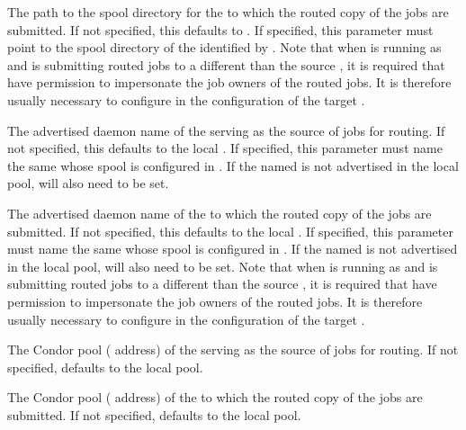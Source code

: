 \begin{description}
\label{param:JobRouterSchedd2Spool}
\item[\Macro{JOB\_ROUTER\_SCHEDD2\_SPOOL}]
  The path to the spool directory for the  to which the
  routed copy of the jobs are submitted.  If not specified, this defaults to
  .  
  If specified, this parameter must point to the spool directory of 
  the  identified by .
  Note that when  is running as  and is
  submitting routed jobs to a different  than the
  source , it is required that 
  have permission to impersonate the job owners of the routed jobs.
  It is therefore usually necessary to configure
   in the configuration
  of the target .

\label{param:JobRouterSchedd1Name}
\item[\Macro{JOB\_ROUTER\_SCHEDD1\_NAME}]
  The advertised daemon name of the  serving as the
  source of jobs for routing.  If not specified, this defaults to the
  local .  If specified, this parameter must name the
  same  whose spool is configured in
  .  If the named  is
  not advertised in the local pool, 
  will also need to be set.

\label{param:JobRouterSchedd2Name}
\item[\Macro{JOB\_ROUTER\_SCHEDD2\_NAME}]
  The advertised daemon name of the  to which the
  routed copy of the jobs are submitted.  If not specified, this defaults to
  the local .  If specified, this parameter must name the
  same  whose spool is configured in
  .  If the named  is
  not advertised in the local pool, 
  will also need to be set.
  Note that when  is running as  and is
  submitting routed jobs to a different  than the
  source , it is required that 
  have permission to impersonate the job owners of the routed jobs.
  It is therefore usually necessary to configure
   in the configuration
  of the target .

\label{param:JobRouterSchedd1Pool}
\item[\Macro{JOB\_ROUTER\_SCHEDD1\_POOL}]
  The Condor pool ( address) of the  
  serving as the source of jobs for routing.
  If not specified, defaults to the local pool.

\label{param:JobRouterSchedd2Pool}
\item[\Macro{JOB\_ROUTER\_SCHEDD2\_POOL}]
  The Condor pool ( address) of the 
  to which the routed copy of the jobs are submitted.
  If not specified, defaults to the local pool.

\end{description}




